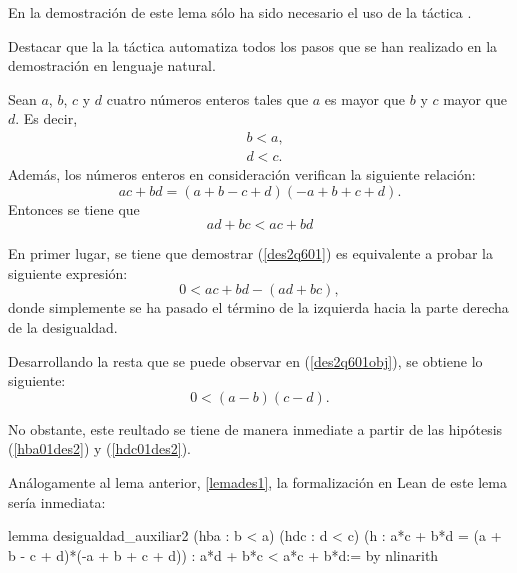 En la demostración de este lema sólo ha sido necesario el uso de la
táctica .

Destacar que la la táctica  automatiza
todos los pasos que se han realizado en la demostración en lenguaje
natural.

\begin{lema}\label{lemades2}
  Sean \(a\), \(b\), \(c\) y \(d\) cuatro números enteros tales que
  \(a\) es mayor que \(b\) y \(c\) mayor que \(d\). Es decir,
  \begin{align}
    &b<a,\tag{hba}\label{hba01des2}\\
    &d<c.\tag{hdc}\label{hdc01des2}
  \end{align}
  Además, los números enteros en consideración verifican la siguiente
  relación:
    \begin{equation}\tag{h}
      ac+bd = (a+b-c+d)(-a+b+c+d).
    \end{equation}
    Entonces se tiene que
    \begin{equation}\label{des2q601}
      ad+bc < ac+bd
    \end{equation}
\end{lema}

\begin{demostracion}
  En primer lugar, se tiene que demostrar (\ref{des2q601}) es
  equivalente a probar la siguiente expresión:
  \begin{equation}\label{des2q601obj}
      0<ac+bd-(ad+bc),
  \end{equation}
  donde simplemente se ha pasado el término de la izquierda hacia la
  parte derecha de la desigualdad.

  Desarrollando la resta que se puede observar en (\ref{des2q601obj}),
  se obtiene lo siguiente:
  \begin{equation}
    0<(a-b)(c-d).
  \end{equation}

  No obstante, este reultado se tiene de manera inmediate a partir de
  las hipótesis (\ref{hba01des2}) y (\ref{hdc01des2}).
\end{demostracion}

Análogamente al lema anterior, \ref{lemades1}, la formalización en Lean
de este lema sería inmediata:
\begin{leancode}
lemma desigualdad_auxiliar2
  (hba : b < a)
  (hdc : d < c)
  (h : a*c + b*d = (a + b - c + d)*(-a + b + c + d))
  : a*d + b*c < a*c + b*d:=
by nlinarith
\end{leancode}

